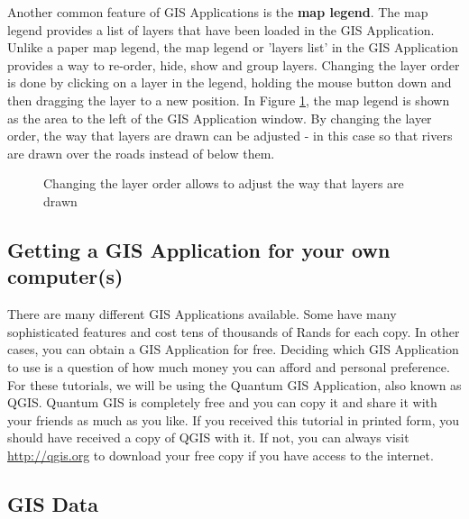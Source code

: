 Another common feature of GIS Applications is the \textbf{map legend}. The
map legend
provides a list of layers that have been loaded in the GIS Application.
Unlike a paper map legend, the map legend or 'layers list' in the GIS
Application provides a way to re-order, hide, show and group layers. Changing
the layer order is done by clicking on a layer in the legend, holding the
mouse button down and then dragging the layer to a new position. In
Figure \ref{fig:layerdrag}, the map legend is shown as the area to the left
of the GIS Application window. By changing the layer order, the way that
layers are drawn can be adjusted - in this case so that rivers are drawn over
the roads instead of below them.

\begin{figure}[h]
\centering
\caption{Changing the layer order allows to adjust the way that layers are
drawn}\label{fig:layerdrag}
   \goodgap
\end{figure}

\subsection{Getting a GIS Application for your own
computer(s)}\label{subsec:getagis}

There are many different GIS Applications available. Some have many
sophisticated features and cost tens of thousands of Rands for each copy. In
other cases, you can obtain a GIS Application for free. Deciding which GIS
Application to use is a question of how much money you can afford and
personal preference. For these tutorials, we will be using the Quantum GIS
Application, also known as QGIS. Quantum GIS is completely free and you can
copy it and share it with your friends as much as you like. If you received
this tutorial in printed form, you should have received a copy of QGIS with
it. If not, you can always visit \url{http://qgis.org} to download your free
copy if you have access to the internet.

\subsection{GIS Data}\label{subsec:gisdata}

